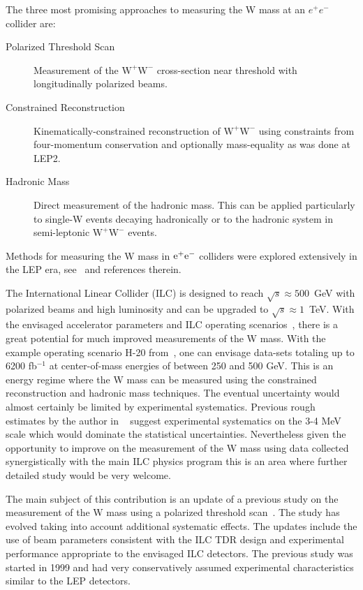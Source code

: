 \documentclass[12pt]{article}
\begin{document}
The three most promising approaches to measuring 
the W mass at an $e^{+} e^{-}$ collider are: 
\begin{description}
\item[Polarized Threshold Scan] Measurement of  
the $\mathrm{W}^+\mathrm{W}^-$ cross-section near threshold with longitudinally 
polarized beams.
\item [Constrained Reconstruction] Kinematically-constrained reconstruction of $\mathrm{W}^+\mathrm{W}^-$ using 
constraints from four-momentum conservation and optionally mass-equality 
as was done at LEP2.
\item [Hadronic Mass] Direct measurement of the hadronic mass. This can be applied 
particularly to single-W events decaying hadronically 
or to the hadronic system in semi-leptonic $\mathrm{W}^+\mathrm{W}^-$ events.
\end{description}
Methods for measuring the W mass in $\rm{e}^+\rm{e}^-$ colliders were explored extensively in the LEP era, 
see~\cite{Kunszt,Stirling} and references therein.

The International Linear Collider (ILC) is designed to 
reach $\sqrt{s} \approx 500$~GeV with polarized beams and high luminosity and can 
be upgraded to $\sqrt{s} \approx 1$~TeV. 
With the envisaged accelerator parameters and ILC operating scenarios~\cite{Barklow:2015tja}, 
there is a great potential for much improved measurements of the W mass. 
With the example operating scenario H-20 from~\cite{Barklow:2015tja}, 
one can envisage data-sets totaling up to 6200 fb$^{-1}$ at center-of-mass 
energies of between 250 and 500 GeV. 
This is an energy regime where the W mass can be measured using the 
constrained reconstruction and hadronic mass techniques. The 
eventual uncertainty would almost certainly be limited by experimental systematics. 
Previous rough estimates by the author in ~\cite{Baak:2013fwa} suggest experimental systematics 
on the 3-4 MeV scale which would dominate the statistical uncertainties.  
Nevertheless given the opportunity to improve on the measurement of the W mass using data collected 
synergistically with the main ILC physics program this is an area where further 
detailed study would be very welcome.

The main subject of this contribution is an update of a previous study on the measurement of the W mass 
using a polarized threshold scan~\cite{Wilson_Sitges, Wilson_TDR2}. 
The study has evolved taking into account additional systematic effects.
The updates include the use of beam parameters consistent with the ILC TDR design and 
experimental performance appropriate to the envisaged ILC detectors. The previous study was 
started in 1999 and had very conservatively assumed experimental characteristics similar to 
the LEP detectors. 
\end{document}
